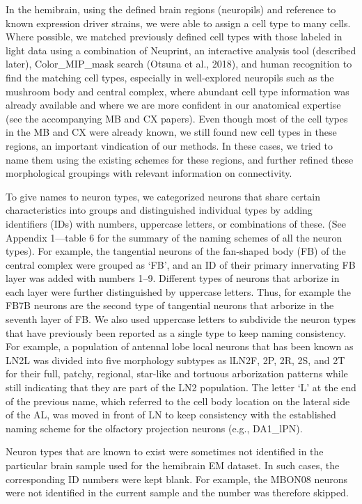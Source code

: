 \documentclass{article}
\begin{document}
In the hemibrain, using the defined brain regions (neuropils) and reference to known expression driver strains, we were able to assign a cell type to many cells. Where possible, we matched previously defined cell types with those labeled in light data using a combination of Neuprint, an interactive analysis tool (described later), Color\_MIP\_mask search (Otsuna et al., 2018), and human recognition to find the matching cell types, especially in well-explored neuropils such as the mushroom body and central complex, where abundant cell type information was already available and where we are more confident in our anatomical expertise (see the accompanying MB and CX papers). Even though most of the cell types in the MB and CX were already known, we still found new cell types in these regions, an important vindication of our methods. In these cases, we tried to name them using the existing schemes for these regions, and further refined these morphological groupings with relevant information on connectivity.

To give names to neuron types, we categorized neurons that share certain characteristics into groups and distinguished individual types by adding identifiers (IDs) with numbers, uppercase letters, or combinations of these. (See Appendix 1—table 6 for the summary of the naming schemes of all the neuron types). For example, the tangential neurons of the fan-shaped body (FB) of the central complex were grouped as ‘FB’, and an ID of their primary innervating FB layer was added with numbers 1–9. Different types of neurons that arborize in each layer were further distinguished by uppercase letters. Thus, for example the FB7B neurons are the second type of tangential neurons that arborize in the seventh layer of FB. We also used uppercase letters to subdivide the neuron types that have previously been reported as a single type to keep naming consistency. For example, a population of antennal lobe local neurons that has been known as LN2L was divided into five morphology subtypes as lLN2F, 2P, 2R, 2S, and 2T for their full, patchy, regional, star-like and tortuous arborization patterns while still indicating that they are part of the LN2 population. The letter ‘L’ at the end of the previous name, which referred to the cell body location on the lateral side of the AL, was moved in front of LN to keep consistency with the established naming scheme for the olfactory projection neurons (e.g., DA1\_lPN).

Neuron types that are known to exist were sometimes not identified in the particular brain sample used for the hemibrain EM dataset. In such cases, the corresponding ID numbers were kept blank. For example, the MBON08 neurons were not identified in the current sample and the number was therefore skipped.
\end{document}
